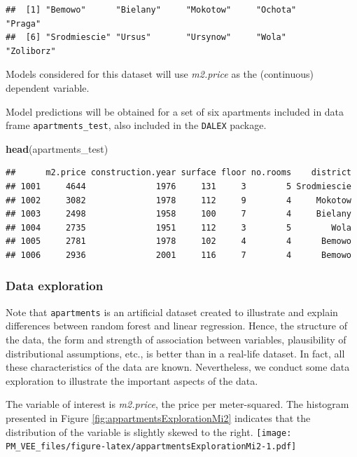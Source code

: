 \documentclass[12pt,]{krantz}
\newenvironment{Shaded}{\begin{snugshade}}{\end{snugshade}}
\newcommand{\KeywordTok}[1]{\textcolor[rgb]{0.13,0.29,0.53}{\textbf{#1}}}
\newcommand{\NormalTok}[1]{#1}
\begin{document}
\begin{verbatim}
##  [1] "Bemowo"      "Bielany"     "Mokotow"     "Ochota"      "Praga"      
##  [6] "Srodmiescie" "Ursus"       "Ursynow"     "Wola"        "Zoliborz"
\end{verbatim}

Models considered for this dataset will use \emph{m2.price} as the (continuous) dependent variable.

Model predictions will be obtained for a set of six apartments included in data frame \texttt{apartments\_test}, also included in the \texttt{DALEX} package.

\begin{Shaded}
\begin{Highlighting}[]
\KeywordTok{head}\NormalTok{(apartments_test)}
\end{Highlighting}
\end{Shaded}

\begin{verbatim}
##      m2.price construction.year surface floor no.rooms    district
## 1001     4644              1976     131     3        5 Srodmiescie
## 1002     3082              1978     112     9        4     Mokotow
## 1003     2498              1958     100     7        4     Bielany
## 1004     2735              1951     112     3        5        Wola
## 1005     2781              1978     102     4        4      Bemowo
## 1006     2936              2001     116     7        4      Bemowo
\end{verbatim}

\hypertarget{exploration-apartments}{%
\subsubsection{Data exploration}\label{exploration-apartments}}

Note that \texttt{apartments} is an artificial dataset created to illustrate and explain differences between random forest and linear regression. Hence, the structure of the data, the form and strength of association between variables, plausibility of distributional assumptions, etc., is better than in a real-life dataset. In fact, all these characteristics of the data are known. Nevertheless, we conduct some data exploration to illustrate the important aspects of the data.

The variable of interest is \emph{m2.price}, the price per meter-squared. The histogram presented in Figure \ref{fig:appartmentsExplorationMi2} indicates that the distribution of the variable is slightly skewed to the right.
\texttt{[image: PM\_VEE\_files/figure-latex/appartmentsExplorationMi2-1.pdf]}
\end{document}
